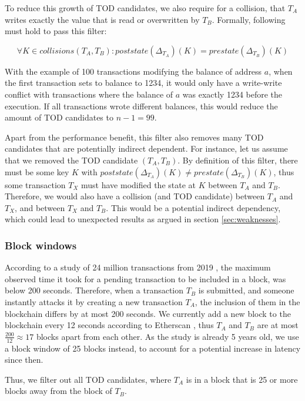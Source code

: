\documentclass[draft,final]{vutinfth} %
\begin{document}
To reduce this growth of TOD candidates, we also require for a collision, that $T_A$ writes exactly the value that is read or overwritten by $T_B$. Formally, following must hold to pass this filter:

$$\forall K \in collisions(T_A, T_B)\colon poststate(\Delta_{T_A})(K) = prestate(\Delta_{T_B})(K)$$

With the example of 100 transactions modifying the balance of address $a$, when the first transaction sets to balance to 1234, it would only have a write-write conflict with transactions where the balance of $a$ was exactly 1234 before the execution. If all transactions wrote different balances, this would reduce the amount of TOD candidates to $n-1 = 99$.

Apart from the performance benefit, this filter also removes many TOD candidates that are potentially indirect dependent. For instance, let us assume that we removed the TOD candidate $(T_A, T_B)$. By definition of this filter, there must be some key $K$ with $poststate(\Delta_{T_A})(K) \neq prestate(\Delta_{T_B})(K)$, thus some transaction $T_X$ must have modified the state at $K$ between $T_A$ and $T_B$. Therefore, we would also have a collision (and TOD candidate) between $T_A$ and $T_X$, and between $T_X$ and $T_B$. This would be a potential indirect dependency, which could lead to unexpected results as argued in section \ref{sec:weaknesses}.

\subsubsection{Block windows}

According to a study of 24 million transactions from 2019 \cite{zhang_evaluation_2021}, the maximum observed time it took for a pending transaction to be included in a block, was below 200 seconds. Therefore, when a transaction $T_B$ is submitted, and someone instantly attacks it by creating a new transaction $T_A$, the inclusion of them in the blockchain differs by at most 200 seconds. We currently add a new block to the blockchain every 12 seconds according to Etherscan \cite{etherscan_ethereum_2024}, thus $T_A$ and $T_B$ are at most $\frac{200}{12} \approx 17$ blocks apart from each other. As the study is already 5 years old, we use a block window of 25 blocks instead, to account for a potential increase in latency since then.

Thus, we filter out all TOD candidates, where $T_A$ is in a block that is 25 or more blocks away from the block of $T_B$.
\end{document}

